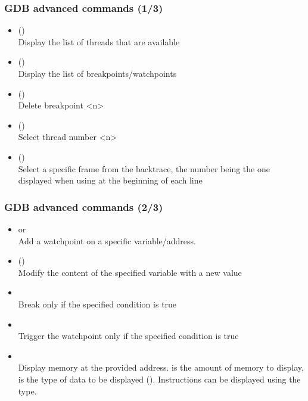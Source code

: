{
\begin{frame}
  \frametitle{GDB advanced commands (1/3)}
  \small
  \begin{itemize}
    \item {} ()\\
      Display the list of threads that are available
    \item {} ()\\
      Display the list of breakpoints/watchpoints
    \item {} ()\\
      Delete breakpoint <n>
    \item {} ()\\
      Select thread number <n>
    \item {} ()\\
      Select a specific frame from the backtrace, the number being the one
      displayed when using  at the beginning of each line
  \end{itemize}
\end{frame}

\begin{frame}
  \frametitle{GDB advanced commands (2/3)}
  \small
  \begin{itemize}
    \item {} or \\
      Add a watchpoint on a specific variable/address.
    \item {} ()\\
      Modify the content of the specified variable with a new value
    \item {}\\
      Break only if the specified condition is true
    \item {}\\
      Trigger the watchpoint only if the specified condition is true
    \item {}\\
      Display memory at the provided address.  is the amount of memory to
      display,  is the type of data to be displayed ().
      Instructions can be displayed using the  type.
  \end{itemize}
\end{frame}

}
